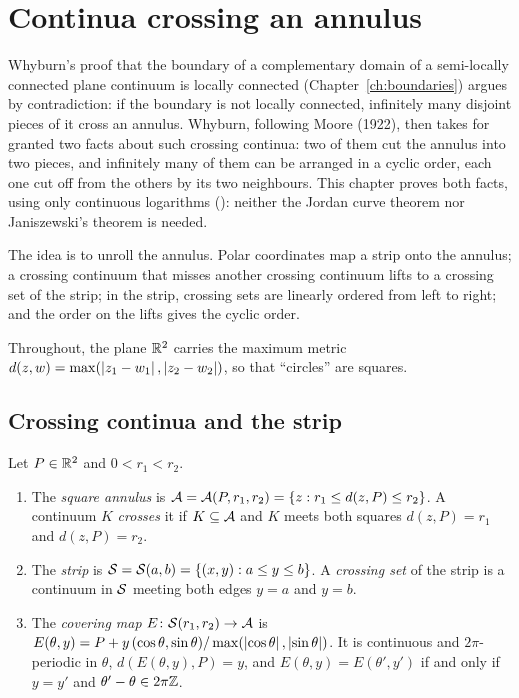 \chapter{Continua crossing an annulus}\label{ch:sectors}

Whyburn's proof that the boundary of a complementary domain of a semi-locally connected plane continuum is
locally connected (Chapter~\ref{ch:boundaries}) argues by contradiction: if the boundary is not locally
connected, infinitely many disjoint pieces of it cross an annulus. Whyburn, following Moore (1922), then takes
for granted two facts about such crossing continua: two of them cut the annulus into two pieces, and
infinitely many of them can be arranged in a cyclic order, each one cut off from the others by its two
neighbours. This chapter proves both facts, using only continuous logarithms (): neither
the Jordan curve theorem nor Janiszewski's theorem is needed.

The idea is to unroll the annulus. Polar coordinates map a strip onto the annulus; a crossing continuum that
misses another crossing continuum lifts to a crossing set of the strip; in the strip, crossing sets are
linearly ordered from left to right; and the order on the lifts gives the cyclic order.

Throughout, the plane $\mathbb{R}^2$ carries the maximum metric $d(z,w)=\max(\left\lvert z_1-w_1\right\rvert,\left\lvert z_2-w_2\right\rvert)$, so that ``circles''
are squares.

\section{Crossing continua and the strip}

\begin{definition}\label{def:annulus}
Let $P\in\mathbb{R}^2$ and $0<r_1<r_2$.
\begin{enumerate}[label=(\alph*)]
\item The \emph{square annulus} is $\mathcal{A}=\mathcal{A}(P,r_1,r_2)=\left\{ z: r_1\le d(z,P)\le r_2 \right\}$. A continuum $K$ \emph{crosses} it if
$K\subseteq\mathcal{A}$ and $K$ meets both squares $d(z,P)=r_1$ and $d(z,P)=r_2$.
\item The \emph{strip} is $\mathcal{S}=\mathcal{S}(a,b)=\left\{ (x,y): a\le y\le b \right\}$. A \emph{crossing set} of the strip is a continuum in $\mathcal{S}$
meeting both edges $y=a$ and $y=b$.
\item The \emph{covering map} $E\colon\mathcal{S}(r_1,r_2)\to\mathcal{A}$ is $E(\theta,y)=P+y\,(\cos\theta,\sin\theta)/\max(\left\lvert \cos\theta\right\rvert,\left\lvert \sin\theta\right\rvert)$. It is
continuous and $2\pi$-periodic in $\theta$, $d(E(\theta,y),P)=y$, and $E(\theta,y)=E(\theta',y')$ if and only if $y=y'$ and $\theta'-\theta\in2\pi\mathbb{Z}$.
\end{enumerate}
\end{definition}

